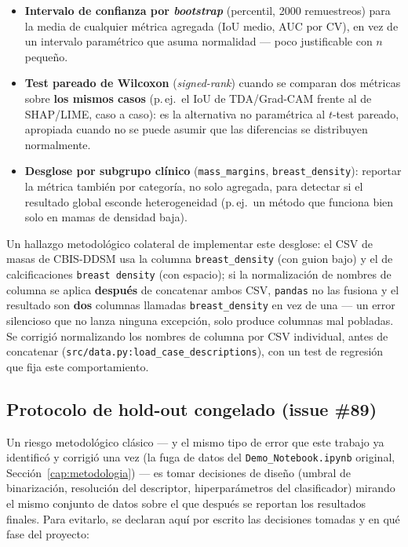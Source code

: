 \begin{itemize}
  \item \textbf{Intervalo de confianza por \textit{bootstrap}} (percentil,
        2000 remuestreos) para la media de cualquier métrica agregada (IoU
        medio, AUC por CV), en vez de un intervalo paramétrico que asuma
        normalidad --- poco justificable con $n$ pequeño.
  \item \textbf{Test pareado de Wilcoxon} (\textit{signed-rank}) cuando se
        comparan dos métricas sobre \textbf{los mismos casos} (p.\,ej.\ el
        IoU de TDA/Grad-CAM frente al de SHAP/LIME, caso a caso): es la
        alternativa no paramétrica al $t$-test pareado, apropiada cuando no
        se puede asumir que las diferencias se distribuyen normalmente.
  \item \textbf{Desglose por subgrupo clínico} (\texttt{mass\_margins},
        \texttt{breast\_density}): reportar la métrica también por
        categoría, no solo agregada, para detectar si el resultado global
        esconde heterogeneidad (p.\,ej.\ un método que funciona bien solo
        en mamas de densidad baja).
\end{itemize}

Un hallazgo metodológico colateral de implementar este desglose: el CSV de
masas de CBIS-DDSM usa la columna \texttt{breast\_density} (con guion bajo)
y el de calcificaciones \texttt{breast density} (con espacio); si la
normalización de nombres de columna se aplica \textbf{después} de
concatenar ambos CSV, \texttt{pandas} no las fusiona y el resultado son
\textbf{dos} columnas llamadas \texttt{breast\_density} en vez de una
--- un error silencioso que no lanza ninguna excepción, solo produce
columnas mal pobladas. Se corrigió normalizando los nombres de columna por
CSV individual, antes de concatenar (\texttt{src/data.py:load\_case\_descriptions}),
con un test de regresión que fija este comportamiento.

\subsection{Protocolo de hold-out congelado (issue \#89)}
\label{subsec:holdout-congelado}
Un riesgo metodológico clásico --- y el mismo tipo de error que este
trabajo ya identificó y corrigió una vez (la fuga de datos del
\texttt{Demo\_Notebook.ipynb} original, Sección~\ref{cap:metodologia}) ---
es tomar decisiones de diseño (umbral de binarización, resolución del
descriptor, hiperparámetros del clasificador) mirando el mismo conjunto de
datos sobre el que después se reportan los resultados finales. Para
evitarlo, se declaran aquí por escrito las decisiones tomadas y en qué
fase del proyecto:

